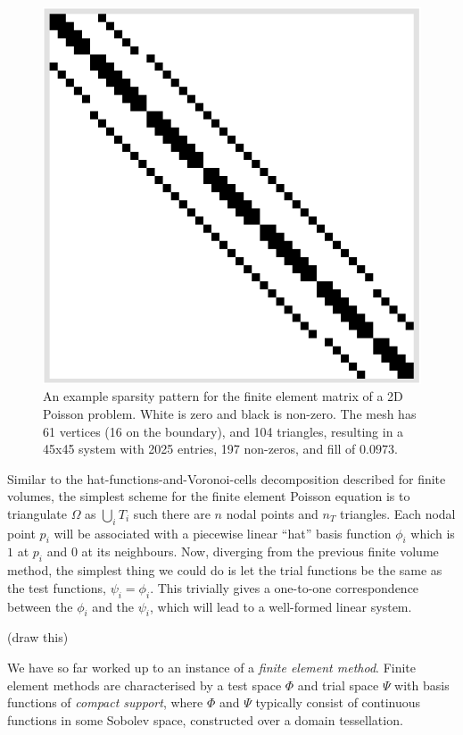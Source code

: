 \begin{figure}[H]
    \begin{center}
        \includegraphics[width=0.26\linewidth]{figures/sparsity_pattern_no_text.png}
    \end{center}
    \caption{\scriptsize
        An example sparsity pattern for the finite element matrix of a 2D Poisson problem. White is zero and black is non-zero.
        The mesh has 61 vertices (16 on the boundary), and 104 triangles, resulting in a 45x45 system with 2025 entries, 197 non-zeros, and fill of $0.0973$.
    }
    \label{sparsity_pattern}
\end{figure}


Similar to the hat-functions-and-Voronoi-cells decomposition described for finite volumes,
the simplest scheme for the finite element Poisson equation is to triangulate $\Omega$ as
    $\bigcup_i T_i$
such there are $n$ nodal points and $n_T$ triangles.
Each nodal point $p_i$ will be associated with a piecewise linear ``hat'' basis function $\phi_i$ which is $1$ at $p_i$ and
$0$ at its neighbours. Now, diverging from the previous finite volume method, the simplest thing we could do is let the trial functions be the same
as the test functions, $\psi_i = \phi_i$. This trivially gives a one-to-one correspondence between the $\phi_i$ and the $\psi_i$, which will lead
to a well-formed linear system.

\vskip 0.1in
(draw this)
\vskip 0.1in


We have so far worked up to an instance of a \textit{finite element method}.
Finite element methods are characterised by a test space $\Phi$ and trial space
$\Psi$ with basis functions of \textit{compact support}, where $\Phi$ and $\Psi$ typically consist of continuous functions in
some Sobolev space, constructed over a domain tessellation.

